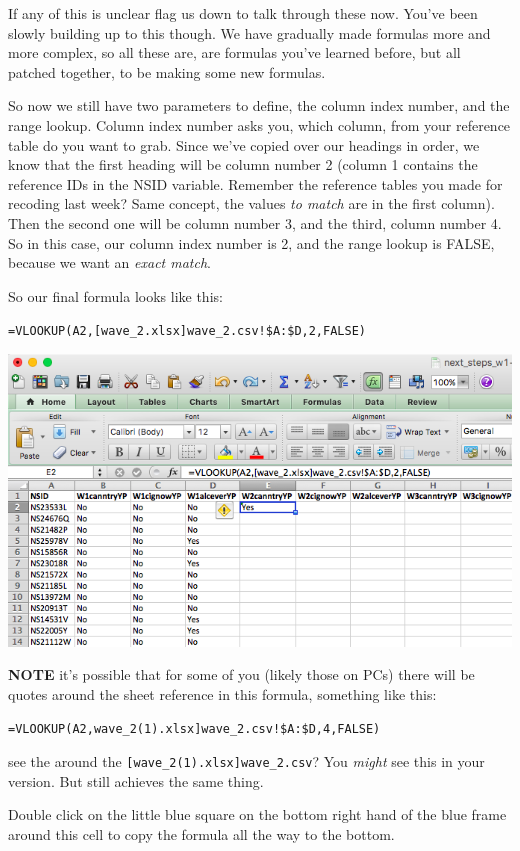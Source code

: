 \documentclass[
]{book}
\begin{document}
If any of this is unclear flag us down to talk through these now. You've been slowly building up to this though. We have gradually made formulas more and more complex, so all these are, are formulas you've learned before, but all patched together, to be making some new formulas.

So now we still have two parameters to define, the column index number, and the range lookup. Column index number asks you, which column, from your reference table do you want to grab. Since we've copied over our headings in order, we know that the first heading will be column number 2 (column 1 contains the reference IDs in the NSID variable. Remember the reference tables you made for recoding last week? Same concept, the values \emph{to match} are in the first column). Then the second one will be column number 3, and the third, column number 4. So in this case, our column index number is 2, and the range lookup is FALSE, because we want an \emph{exact match}.

So our final formula looks like this:

\texttt{=VLOOKUP(A2,{[}wave\_2.xlsx{]}wave\_2.csv!\$A:\$D,2,FALSE)}

\includegraphics{imgs/merge_first_form.png}

\textbf{NOTE} it's possible that for some of you (likely those on PCs) there will be quotes around the sheet reference in this formula, something like this:

\texttt{=VLOOKUP(A2,\textquotesingle{}{[}wave\_2(1).xlsx{]}wave\_2.csv\textquotesingle{}!\$A:\$D,4,FALSE)}

see the \texttt{\textquotesingle{}} around the \texttt{{[}wave\_2(1).xlsx{]}wave\_2.csv}? You \emph{might} see this in your version. But still achieves the same thing.

Double click on the little blue square on the bottom right hand of the blue frame around this cell to copy the formula all the way to the bottom.
\end{document}
